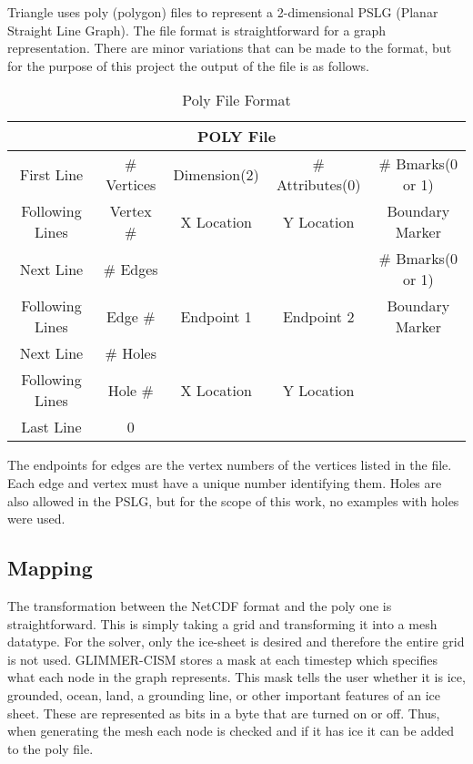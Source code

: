 Triangle uses poly (polygon) files to represent a 2-dimensional PSLG (Planar Straight Line Graph).  The file format is straightforward for a graph representation.  There are minor variations that can be made to the format, but for the purpose of this project the output of the file is as follows.

\begin{table}[ht]
\caption{Poly File Format}
\centering
\begin{center}
    \begin{tabular}{ | c | c | c | c | c |}
    \hline
    \multicolumn{5}{|c|}{POLY File}\\
    \hline
    First Line & \# Vertices & Dimension(2) & \# Attributes(0) & \# Bmarks(0 or 1)  \\ \hline
    Following Lines & Vertex \# & X Location & Y Location & Boundary Marker \\ \hline
    Next Line & \# Edges & & & \# Bmarks(0 or 1) \\ \hline
    Following Lines & Edge \# & Endpoint 1 & Endpoint 2 & Boundary Marker \\ \hline
    Next Line & \# Holes & & & \\ \hline
    Following Lines & Hole \# & X Location & Y Location & \\ \hline
    Last Line & 0 & & & \\ \hline
    \end{tabular}
\end{center}
\end{table}

\citep{Triangle:website}

The endpoints for edges are the vertex numbers of the vertices listed in the file.  Each edge and vertex must have a unique number identifying them.  Holes are also allowed in the PSLG, but for the scope of this work, no examples with holes were used.

\subsection{Mapping}\label{sec:chp3map}


The transformation between the NetCDF format and the poly one is straightforward.  This is simply taking a grid and transforming it into a mesh datatype.  For the solver, only the ice-sheet is desired and therefore the entire grid is not used.  GLIMMER-CISM stores a mask at each timestep which specifies what each node in the graph represents.  This mask tells the user whether it is ice, grounded, ocean, land, a grounding line, or other important features of an ice sheet.  These are represented as bits in a byte that are turned on or off.  Thus, when generating the mesh each node is checked and if it has ice it can be added to the poly file.  

